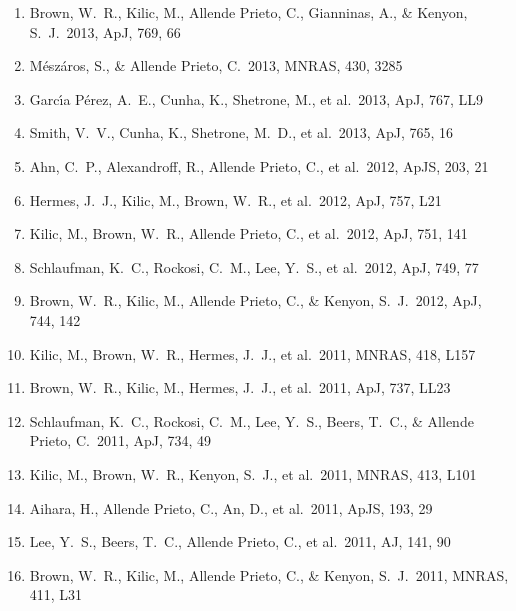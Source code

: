 \documentclass[12pt]{article}
\begin{document}
\begin{enumerate}
\item Brown, W.~R., Kilic, M., 
Allende Prieto, C., Gianninas, A., \& Kenyon, S.~J.\ 2013, ApJ, 769, 66 


\item M{\'e}sz{\'a}ros, S., \& Allende Prieto, C.\ 2013, MNRAS, 430, 3285 


\item
Garc{\'{\i}}a P{\'e}rez, A.~E., Cunha, K., Shetrone, M., et al.\ 2013, 
ApJ, 767, LL9 


\item Smith, V.~V., Cunha, K., 
Shetrone, M.~D., et al.\ 2013, ApJ, 765, 16 


\item Ahn, C.~P., Alexandroff, 
R., Allende Prieto, C., et al.\ 2012, ApJS, 203, 21 


\item Hermes, J.~J., Kilic, 
M., Brown, W.~R., et al.\ 2012, ApJ, 757, L21 


\item Kilic, M., Brown, W.~R., 
Allende Prieto, C., et al.\ 2012, ApJ, 751, 141 


\item Schlaufman, K.~C., 
Rockosi, C.~M., Lee, Y.~S., et al.\ 2012, ApJ, 749, 77 


\item Brown, W.~R., Kilic, M., 
Allende Prieto, C., \& Kenyon, S.~J.\ 2012, ApJ, 744, 142 


\item Kilic, M., Brown, W.~R., 
Hermes, J.~J., et al.\ 2011, MNRAS, 418, L157 


\item Brown, W.~R., Kilic, M., 
Hermes, J.~J., et al.\ 2011, ApJ, 737, LL23 


\item Schlaufman, K.~C., 
Rockosi, C.~M., Lee, Y.~S., Beers, T.~C., 
\& Allende Prieto, C.\ 2011, ApJ, 734, 49 


\item Kilic, M., Brown, W.~R., 
Kenyon, S.~J., et al.\ 2011, MNRAS, 413, L101 


\item Aihara, H., Allende 
Prieto, C., An, D., et al.\ 2011, ApJS, 193, 29 


\item Lee, Y.~S., Beers, T.~C., 
Allende Prieto, C., et al.\ 2011, AJ, 141, 90 


\item Brown, W.~R., Kilic, M., 
Allende Prieto, C., \& Kenyon, S.~J.\ 2011, MNRAS, 411, L31 



\end{enumerate}
\end{document}
